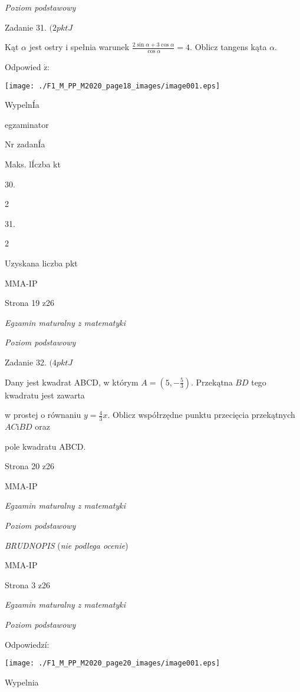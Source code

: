 \documentclass[a4paper,12pt]{article}
\begin{document}
{\it Poziom podstawowy}

Zadanie 31. $(2pktJ$

Kąt $\alpha$ jest ostry i spełnia warunek $\displaystyle \frac{2\sin\alpha+3\cos\alpha}{\cos\alpha}=4$. Oblicz tangens kąta $\alpha.$

Odpowied $\acute{\mathrm{z}}$:
\begin{center}
\texttt{[image: ./F1\_M\_PP\_M2020\_page18\_images/image001.eps]}
\end{center}
WypelnÍa

egzaminator

Nr zadanÍa

Maks. lÍczba kt

30.

2

31.

2

Uzyskana liczba pkt

MMA-IP

Strona 19 z26





{\it Egzamin maturalny z matematyki}

{\it Poziom podstawowy}

Zadanie 32. $(4pktJ$

Dany jest kwadrat ABCD, w którym $A=(5,-\displaystyle \frac{5}{3})$. Przekątna $BD$ tego kwadratu jest zawarta

w prostej o równaniu $y=\displaystyle \frac{4}{3}x$. Oblicz współrzędne punktu przecięcia przekątnych $AC\mathrm{i}BD$ oraz

pole kwadratu ABCD.

Strona 20 z26

MMA-IP





{\it Egzamin maturalny z matematyki}

{\it Poziom podstawowy}

{\it BRUDNOPIS} ({\it nie podlega ocenie})

MMA-IP

Strona 3 z26





{\it Egzamin maturalny z matematyki}

{\it Poziom podstawowy}

Odpowiedzí:
\begin{center}
\texttt{[image: ./F1\_M\_PP\_M2020\_page20\_images/image001.eps]}
\end{center}
Wypelnia
\end{document}
